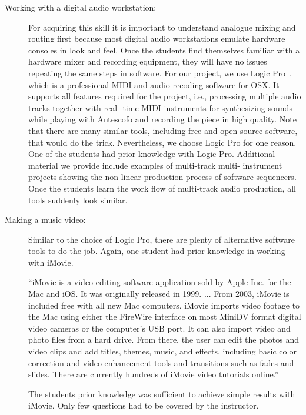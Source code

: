 \documentclass[onecolumn,nocopyrightspace,preprint]{sigplanconf}
\begin{document}
\begin{description}
\item[Working with a digital audio workstation:] For acquiring this skill it
is important to understand analogue mixing and routing first because most
digital audio workstations emulate hardware consoles in look and feel. Once
the students find themselves familiar with a hardware mixer and recording
equipment, they will have no issues repeating the same steps in software. For
our project, we use Logic Pro~\cite{website:logic}, which is a professional
MIDI and audio recoding software for OSX. It supports all features required
for the project, i.e., processing multiple audio tracks together with real-
time MIDI instruments for synthesizing sounds while playing with Antescofo and
recording the piece in high quality.  Note that there are many similar tools,
including free and open source software, that would do the trick.
Nevertheless, we choose Logic Pro for one reason. One of the students had
prior knowledge with Logic Pro. Additional material we provide include
examples of multi-track multi- instrument projects showing the non-linear
production process of software sequencers. Once the students learn the work
flow of multi-track audio production, all tools suddenly look similar.

\item[Making a music video:] Similar to the choice of Logic Pro, there are
plenty of alternative software tools to do the job. Again, one student had
prior knowledge in working with iMovie.

``iMovie is a video editing software application sold by Apple Inc. for the Mac
and iOS. It was originally released in 1999. ... From 2003, iMovie is included
free with all new Mac computers. iMovie imports video footage to the Mac using
either the FireWire interface on most MiniDV format digital video cameras or
the computer's USB port. It can also import video and photo files from a hard
drive. From there, the user can edit the photos and video clips and add
titles, themes, music, and effects, including basic color correction and video
enhancement tools and transitions such as fades and slides. There are
currently hundreds of iMovie video tutorials online.''~\cite{website:imovie}

The students prior knowledge was sufficient to achieve simple results with
iMovie. Only few questions had to be covered by the instructor.

\end{description}
\end{document}
